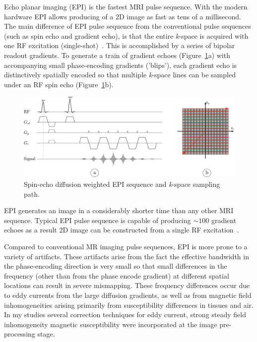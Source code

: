 Echo planar imaging (EPI) is the fastest MRI pulse sequence. 
With the modern hardware EPI allows producing of a 2D image as fast as tens of a millisecond. 
The main difference of EPI pulse sequence from the conventional pulse sequences (such as spin echo and gradient echo), is that the entire \textit{k}-space is acquired with one RF excitation (single-shot)~\cite{RNDT23}. 
This is accomplished by a series of bipolar readout gradients. 
To generate a train of gradient echoes (Figure~\ref{fig: EPI}a) with accompanying small phase-encoding gradients ('blips'), each gradient echo is distinctively spatially encoded so that multiple \textit{k}-space lines can be sampled under an RF spin echo (Figure~\ref{fig: EPI}b).
\begin{figure}[!h]
\vspace{+0.2cm}
\includegraphics[width=\textwidth]{Figures/EPI.pdf}
\caption[Spin-echo diffusion weighted EPI sequence and \textit{k}-space sampling path]{Spin-echo diffusion weighted EPI sequence and \textit{k}-space sampling path.}\label{fig: EPI} 
\end{figure}
EPI generates an image in a considerably shorter time than any other MRI sequence. 
Typical EPI pulse sequence is capable of producing $\sim 100$ gradient echoes as a result 2D image can be constructed from a single RF excitation~\cite{RNDT24}.

Compared to conventional MR imaging pulse sequences, EPI is more prone to a variety of artifacts. 
These artifacts arise from the fact the effective bandwidth in the phase-encoding direction is very small so that small differences in the frequency (other than from the phase encode gradient) at different spatial locations can result in severe mismapping. 
These frequency differences occur due to eddy currents from the large diffusion gradients, as well as from magnetic field inhomogeneities arising primarily from susceptibility differences in tissues and air. 
In my studies several correction techniques for eddy current, strong steady field inhomogeneity magnetic susceptibility were incorporated at the image pre-processing stage.

